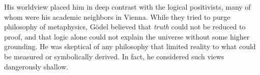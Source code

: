 His worldview placed him in deep contrast with the logical positivists, many of whom were his academic neighbors in Vienna. While they tried to purge philosophy of metaphysics, Gödel believed that \textit{truth} could not be reduced to proof, and that logic alone could not explain the universe without some higher grounding. He was skeptical of any philosophy that limited reality to what could be measured or symbolically derived. In fact, he considered such views dangerously shallow.





